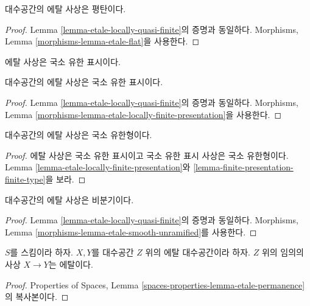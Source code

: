 \begin{lemma}
\label{lemma-etale-flat}
대수공간의 에탈 사상은 평탄이다.
\end{lemma}

\begin{proof}
Lemma \ref{lemma-etale-locally-quasi-finite}의 증명과 동일하다.
Morphisms, Lemma \ref{morphisms-lemma-etale-flat}을 사용한다.
\end{proof}

\begin{lemma}
\label{lemma-etale-locally-finite-presentation}
\begin{slogan}
에탈 사상은 국소 유한 표시이다.
\end{slogan}
대수공간의 에탈 사상은 국소 유한 표시이다.
\end{lemma}

\begin{proof}
Lemma \ref{lemma-etale-locally-quasi-finite}의 증명과 동일하다.
Morphisms, Lemma \ref{morphisms-lemma-etale-locally-finite-presentation}을
사용한다.
\end{proof}

\begin{lemma}
\label{lemma-etale-locally-finite-type}
대수공간의 에탈 사상은 국소 유한형이다.
\end{lemma}

\begin{proof}
에탈 사상은 국소 유한 표시이고 국소 유한 표시 사상은 국소 유한형이다.
Lemma \ref{lemma-etale-locally-finite-presentation}와
\ref{lemma-finite-presentation-finite-type}을 보라.
\end{proof}

\begin{lemma}
\label{lemma-etale-unramified}
대수공간의 에탈 사상은 비분기이다.
\end{lemma}

\begin{proof}
Lemma \ref{lemma-etale-locally-quasi-finite}의 증명과 동일하다.
Morphisms, Lemma \ref{morphisms-lemma-etale-smooth-unramified}를
사용한다.
\end{proof}

\begin{lemma}
\label{lemma-etale-permanence}
$S$를 스킴이라 하자. $X, Y$를 대수공간 $Z$ 위의 에탈 대수공간이라
하자. $Z$ 위의 임의의 사상 $X \to Y$는 에탈이다.
\end{lemma}

\begin{proof}
Properties of Spaces, Lemma \ref{spaces-properties-lemma-etale-permanence}의
복사본이다.
\end{proof}

